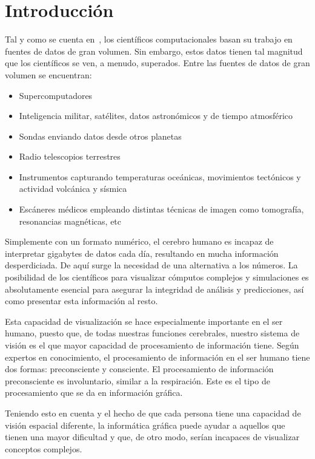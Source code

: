 \cleardoublepage

\chapter{Introducción}
\label{makereference}

Tal y como se cuenta en~\citet{DEFANTI1991247}, los científicos computacionales
basan su trabajo en fuentes de datos de gran volumen. Sin embargo, estos datos
tienen tal magnitud que los científicos se ven, a menudo, superados. Entre las
fuentes de datos de gran volumen se encuentran:

\begin{itemize}
		\item Supercomputadores
		\item Inteligencia militar, satélites, datos astronómicos y de tiempo atmosférico
		\item Sondas enviando datos desde otros planetas
		\item Radio telescopios terrestres
		\item Instrumentos capturando temperaturas oceánicas, movimientos tectónicos y 
				actividad volcánica y sísmica
		\item Escáneres médicos empleando distintas técnicas de imagen como tomografía, 
				resonancias magnéticas, etc
\end{itemize}

Simplemente con un formato numérico, el cerebro humano es incapaz de interpretar
gigabytes de datos cada día, resultando en mucha información desperdiciada. De
aquí surge la necesidad de una alternativa a los números. La posibilidad de los
científicos para visualizar cómputos complejos y simulaciones es absolutamente
esencial para asegurar la integridad de análisis y predicciones, así como
presentar esta información al resto.

Esta capacidad de visualización se hace especialmente importante en el ser
humano, puesto que, de todas nuestras funciones cerebrales, nuestro sistema de
visión es el que mayor capacidad de procesamiento de información tiene. Según
expertos en conocimiento, el procesamiento de información en el ser humano tiene
dos formas: preconsciente y consciente. El procesamiento de información
preconsciente es involuntario, similar a la respiración. Este es el tipo de
procesamiento que se da en información gráfica.
\cite{Rohrer:2000:SBI:510378.510552}

Teniendo esto en cuenta y el hecho de que cada persona tiene una capacidad de
visión espacial diferente, la informática gráfica puede ayudar a aquellos que
tienen una mayor dificultad y que, de otro modo, serían incapaces de visualizar
conceptos complejos.

